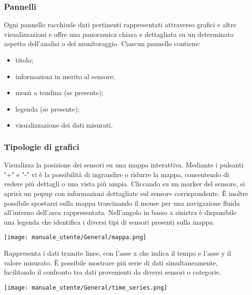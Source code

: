 \subsubsection{Pannelli}
Ogni pannello racchiude dati pertinenti rappresentati attraverso grafici e altre visualizzazioni e offre una panoramica chiara e dettagliata su un determinato aspetto dell'analisi o del monitoraggio. Ciascun pannello contiene:
\begin{itemize}
    \item titolo;
    \item informazioni in merito al sensore;
    \item menù a tendina (se presente);
    \item legenda (se presente);
    \item visualizzazione dei dati misurati.
\end{itemize}

\subsubsection{Tipologie di grafici}
Visualizza la posizione dei sensori su una mappa interattiva. Mediante i pulsanti "+" e "-" vi è la possibilità di ingrandire o ridurre la mappa, consentendo di vedere più dettagli o una vista più ampia. Cliccando su un marker del sensore, si aprirà un popup con informazioni dettagliate sul sensore corrispondente. È inoltre possibile spostarsi sulla mappa trascinando il mouse per una navigazione fluida all'interno dell'area rappresentata. Nell'angolo in basso a sinistra è disponibile una legenda che identifica i diversi tipi di sensori presenti sulla mappa.
\begin{center}
    \texttt{[image: manuale\_utente/General/mappa.png]}
\end{center}

Rappresenta i dati tramite linee, con l'asse x che indica il tempo e l'asse y il valore misurato. È possibile mostrare più serie di dati simultaneamente, facilitando il confronto tra dati provenienti da diversi sensori o categorie.
\begin{center}
    \texttt{[image: manuale\_utente/General/time\_series.png]}
\end{center} 
\newpage


